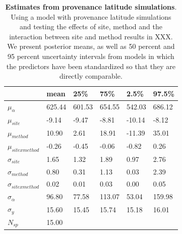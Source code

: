 \documentclass{article}\usepackage[]{graphicx}\usepackage[]{color}
\begin{document}
\begin{table}[ht]
\centering
\caption{\textbf{Estimates from provenance latitude simulations}. Using a model with provenance latitude simulations and testing the effects of site, method and the interaction between site and method results in XXX. We present posterior means, as well as 50 percent and 95 percent uncertainty intervals from models in which the predictors have been standardized so that they are directly comparable.} 
\label{tab:prov}
\begingroup\footnotesize
\begin{tabular}{|p{}|p{}p{}p{}p{}p{}|}
  \hline
 & mean & 25\% & 75\% & 2.5\% & 97.5\% \\ 
  \hline
$\mu_{\alpha}$ & 625.44 & 601.53 & 654.55 & 542.03 & 686.12 \\ 
  $\mu_{site}$ & -9.14 & -9.47 & -8.81 & -10.14 & -8.12 \\ 
  $\mu_{method}$ & 10.90 & 2.61 & 18.91 & -11.39 & 35.01 \\ 
  $\mu_{sitexmethod}$ & -0.26 & -0.45 & -0.06 & -0.82 & 0.26 \\ 
  $\sigma_{site}$ & 1.65 & 1.32 & 1.89 & 0.97 & 2.76 \\ 
  $\sigma_{method}$ & 0.80 & 0.31 & 1.13 & 0.03 & 2.39 \\ 
  $\sigma_{sitexmethod}$ & 0.02 & 0.01 & 0.03 & 0.00 & 0.05 \\ 
  $\sigma_{\alpha}$ & 96.80 & 77.58 & 113.07 & 53.04 & 159.98 \\ 
  $\sigma_{y}$ & 15.60 & 15.45 & 15.74 & 15.18 & 16.01 \\ 
   \hline
$N_{sp}$ & 15.00 &  &  &  &  \\ 
   \hline
\end{tabular}
\endgroup
\end{table}
\end{document}
